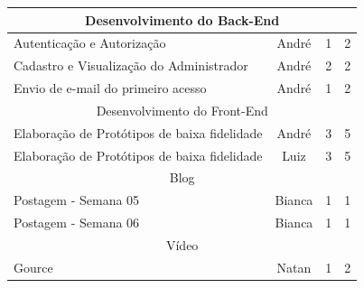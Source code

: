 \begin{apendicesenv}
\begin{quadro}[htb]
\begin{tabular}{|l|c|c|c|}
    \multicolumn{4}{|c|}{Desenvolvimento do Back-End} \\ \hline
    Autenticação e Autorização & André & 1  &  2  \\ \hline 
    Cadastro e Visualização do Administrador & André & 2  &  2  \\ \hline 
    Envio de e-mail do primeiro acesso & André & 1  & 2   \\ \hline 
    
    \multicolumn{4}{|c|}{Desenvolvimento do Front-End} \\ \hline
    Elaboração de Protótipos de baixa fidelidade & André & 3  & 5  \\ \hline 
    Elaboração de Protótipos de baixa fidelidade & Luiz & 3  & 5   \\ \hline 
    
    \multicolumn{4}{|c|}{Blog} \\ \hline
    Postagem - Semana 05      & Bianca    & 1  & 1    \\ \hline
    Postagem - Semana 06      & Bianca     & 1 & 1  \\ \hline
    
    \multicolumn{4}{|c|}{Vídeo} \\ \hline
    Gource & Natan & 1  &  2  \\ \hline
    
\end{tabular}
\end{quadro}
\FloatBarrier


\end{apendicesenv}
